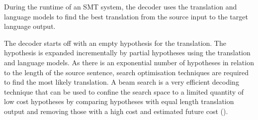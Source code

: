 




During the runtime of an \acrshort{SMT} system, the decoder uses the translation and language models to find the best translation from the source input to the target language output.

The decoder starts off with an empty hypothesis for the translation. The hypothesis is expanded incrementally by partial hypotheses using the translation and language models. As there is an exponential number of hypotheses in relation to the length of the source sentence, search optimisation techniques are required to find the most likely translation. A beam search is a very efficient decoding technique that can be used to confine the search space to a limited quantity of low cost hypotheses by comparing hypotheses with equal length translation output and removing those with a high cost and estimated future cost (\cite{koehn_pharaoh_2004}).







